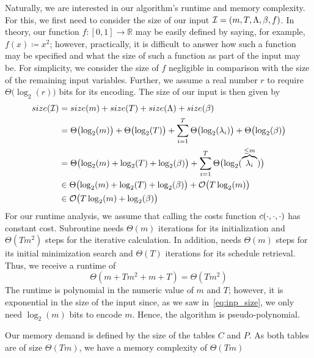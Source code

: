 Naturally, we are interested in our algorithm's runtime and memory complexity.
For this, we first need to consider the size of our input $\mathcal{I}=(m,T,\Lambda,\beta,f)$. In theory, our function $f:[0,1]\rightarrow \mathbb{R}$ may be easily defined by saying, for example, $f(x)\coloneqq x^2$; however, practically, it is difficult to answer how such a function may be specified and what the size of such a function as part of the input may be. For simplicity, we consider the size of $f$ negligible in comparison with the size of the remaining input variables. Further, we assume a real number $r$ to require $\Theta\bigl(\log_2(r)\bigr)$ bits for its encoding. The size of our input is then given by
\begin{align}
	size(\mathcal{I})&=size(m)+size(T)+size(\Lambda)+size(\beta)\nonumber\\
	&=\Theta\bigl(\log_2(m)\bigr)+\Theta\bigl(\log_2(T)\bigr)+\sum\limits_{i=1}^T \Theta\bigl(\log_2(\lambda_i)\bigr)+\Theta\bigl(\log_2(\beta)\bigr)\nonumber\\
	&=\Theta\bigl(\log_2(m)+\log_2(T)+\log_2(\beta)\bigr)+\sum\limits_{i=1}^T \Theta\bigl(\log_2(\overbrace{\lambda_i}^{\le m})\bigr)\nonumber\\
	&\in\Theta\bigl(\log_2(m)+\log_2(T)+\log_2(\beta)\bigr)+\mathcal{O}\bigl(T\log_2(m)\bigr)\nonumber\\
	&\in\mathcal{O}\bigl(T\log_2(m)+\log_2(\beta)\bigr)\label{eq:inp_size}
\end{align}
For our runtime analysis, we assume that calling the costs function $c(\cdot,\cdot,\cdot)$ has constant cost. Subroutine  needs $\Theta(m)$ iterations for its initialization and $\Theta(Tm^2)$ steps for the iterative calculation. In addition,  needs $\Theta(m)$ steps for its initial minimization search and $\Theta(T)$ iterations for its schedule retrieval. Thus, we receive a runtime of 
\begin{equation*}
	\Theta(m+Tm^2+m+T)=\Theta(Tm^2)
\end{equation*}
The runtime is polynomial in the numeric value of $m$ and $T$; however, it is exponential in the size of the input since, as we saw in~\eqref{eq:inp_size}, we only need $\log_2(m)$ bits to encode $m$. Hence, the algorithm is pseudo-polynomial.

Our memory demand is defined by the size of the tables $C$ and $P$. As both tables are of size $\Theta(Tm)$, we have a memory complexity of $\Theta(Tm)$

